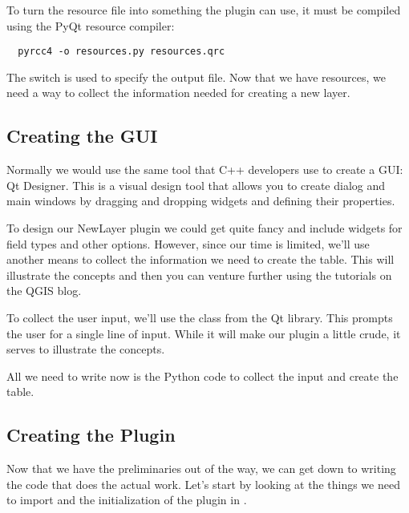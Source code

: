 To turn the resource file into something the plugin can use, it must be compiled using the PyQt resource compiler:

\begin{verbatim}
  pyrcc4 -o resources.py resources.qrc
\end{verbatim}

The  switch is used to specify the output file.
Now that we have resources, we need a way to collect the information needed for creating a new layer.

\subsection{Creating the GUI}

Normally we would use the same tool that C++ developers use to create a GUI: Qt Designer.
This is a visual design tool that allows you to create dialog and main windows by dragging and dropping widgets and defining their properties.

To design our NewLayer plugin we could get quite fancy and include widgets for field types and other options.
However, since our time is limited, we'll use another means to collect the information we need to create the table.
This will illustrate the concepts and then you can venture further using the tutorials on the QGIS blog.

To collect the user input, we'll use the  class from the Qt library.
This prompts the user for a single line of input.
While it will make our plugin a little crude, it serves to illustrate the concepts.

All we need to write now is the Python code to collect the input and create the table.

\subsection{Creating the Plugin}

Now that we have the preliminaries out of the way, we can get down to writing the code that does the actual work.
Let's start by looking at the things we need to import and the initialization of the plugin in .

